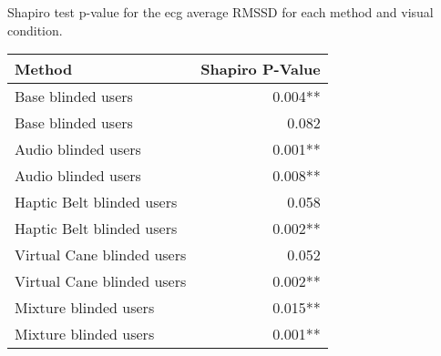 
\centering
\caption{Shapiro test p-value for the ecg average RMSSD for each method and visual condition.}
\label{tab:shapiro_ecg_rmssd}
\begin{tabular}{lr}
\toprule
                    Method & Shapiro P-Value \\
\midrule
        Base blinded users &         0.004** \\
        Base blinded users &           0.082 \\
       Audio blinded users &         0.001** \\
       Audio blinded users &         0.008** \\
 Haptic Belt blinded users &           0.058 \\
 Haptic Belt blinded users &         0.002** \\
Virtual Cane blinded users &           0.052 \\
Virtual Cane blinded users &         0.002** \\
     Mixture blinded users &         0.015** \\
     Mixture blinded users &         0.001** \\
\bottomrule
\end{tabular}
